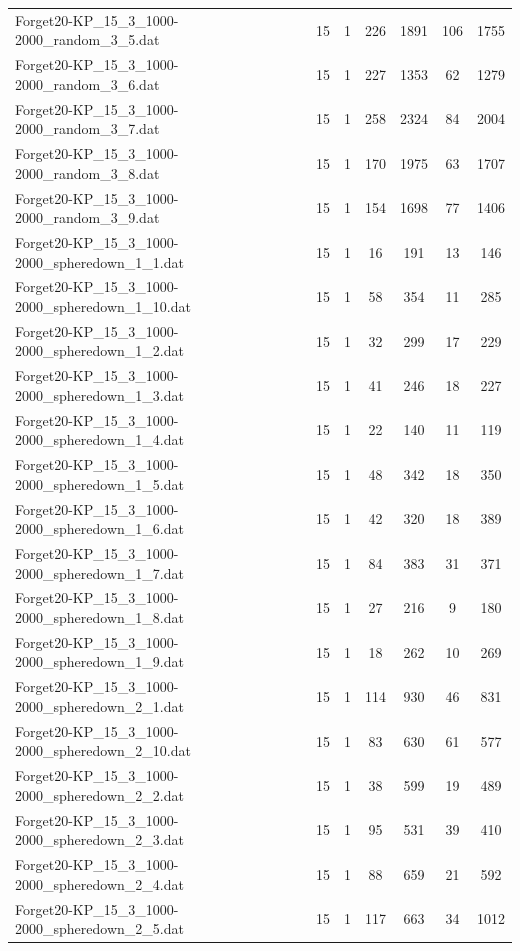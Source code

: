 \begin{table}[!ht]
\begin{tabular}{lcccccc}
Forget20-KP\_15\_3\_1000-2000\_random\_3\_5.dat & 15 & 1 & 226 & 1891 & 106 & 1755 \\
Forget20-KP\_15\_3\_1000-2000\_random\_3\_6.dat & 15 & 1 & 227 & 1353 & 62 & 1279 \\
Forget20-KP\_15\_3\_1000-2000\_random\_3\_7.dat & 15 & 1 & 258 & 2324 & 84 & 2004 \\
Forget20-KP\_15\_3\_1000-2000\_random\_3\_8.dat & 15 & 1 & 170 & 1975 & 63 & 1707 \\
Forget20-KP\_15\_3\_1000-2000\_random\_3\_9.dat & 15 & 1 & 154 & 1698 & 77 & 1406 \\
Forget20-KP\_15\_3\_1000-2000\_spheredown\_1\_1.dat & 15 & 1 & 16 & 191 & 13 & 146 \\
Forget20-KP\_15\_3\_1000-2000\_spheredown\_1\_10.dat & 15 & 1 & 58 & 354 & 11 & 285 \\
Forget20-KP\_15\_3\_1000-2000\_spheredown\_1\_2.dat & 15 & 1 & 32 & 299 & 17 & 229 \\
Forget20-KP\_15\_3\_1000-2000\_spheredown\_1\_3.dat & 15 & 1 & 41 & 246 & 18 & 227 \\
Forget20-KP\_15\_3\_1000-2000\_spheredown\_1\_4.dat & 15 & 1 & 22 & 140 & 11 & 119 \\
Forget20-KP\_15\_3\_1000-2000\_spheredown\_1\_5.dat & 15 & 1 & 48 & 342 & 18 & 350 \\
Forget20-KP\_15\_3\_1000-2000\_spheredown\_1\_6.dat & 15 & 1 & 42 & 320 & 18 & 389 \\
Forget20-KP\_15\_3\_1000-2000\_spheredown\_1\_7.dat & 15 & 1 & 84 & 383 & 31 & 371 \\
Forget20-KP\_15\_3\_1000-2000\_spheredown\_1\_8.dat & 15 & 1 & 27 & 216 & 9 & 180 \\
Forget20-KP\_15\_3\_1000-2000\_spheredown\_1\_9.dat & 15 & 1 & 18 & 262 & 10 & 269 \\
Forget20-KP\_15\_3\_1000-2000\_spheredown\_2\_1.dat & 15 & 1 & 114 & 930 & 46 & 831 \\
Forget20-KP\_15\_3\_1000-2000\_spheredown\_2\_10.dat & 15 & 1 & 83 & 630 & 61 & 577 \\
Forget20-KP\_15\_3\_1000-2000\_spheredown\_2\_2.dat & 15 & 1 & 38 & 599 & 19 & 489 \\
Forget20-KP\_15\_3\_1000-2000\_spheredown\_2\_3.dat & 15 & 1 & 95 & 531 & 39 & 410 \\
Forget20-KP\_15\_3\_1000-2000\_spheredown\_2\_4.dat & 15 & 1 & 88 & 659 & 21 & 592 \\
Forget20-KP\_15\_3\_1000-2000\_spheredown\_2\_5.dat & 15 & 1 & 117 & 663 & 34 & 1012 \\

\end{tabular}
\end{table}
